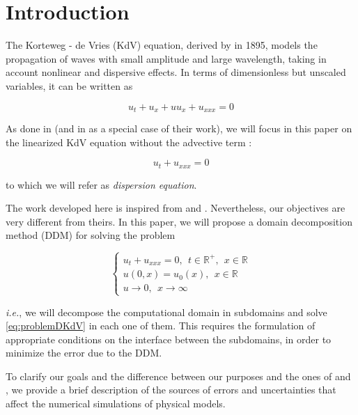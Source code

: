 \section{Introduction}

\indent The Korteweg - de Vries (KdV) equation, derived by \cite{kdv1895} in 1895, models the propagation of waves with small amplitude and large wavelength, taking in account nonlinear and dispersive effects. In terms of dimensionless but unscaled variables, it can be written as \cite{BBM1971}

\begin{equation}
	u_t + u_x + uu_x + u_{xxx} = 0
\end{equation}

\indent As done in \cite{zheng2008} (and in \cite{besse2015} as a special case of their work), we will focus in this paper on the linearized KdV equation without the advective term : 

\begin{equation}
 \label{eq:DKdV}
	u_t  + u_{xxx} = 0
\end{equation}

\noindent to which we will refer as \emph{dispersion equation}.

\indent The work developed here is inspired from \cite{zheng2008} and \cite{besse2015}. Nevertheless, our objectives are very different from theirs. In this paper, we will propose a domain decomposition method (DDM) for solving the problem

\begin{equation}
 \label{eq:problemDKdV}
\begin{cases}
	u_t + u_{xxx} = 0, \ \ t \in \mathbb{R}^+, \ \ x \in \mathbb{R} \\
	u(0,x) = u_0(x), \ \ x \in \mathbb{R} \\
	u \longrightarrow 0, \ \ x \longrightarrow \infty
\end{cases}
\end{equation}

\noindent \emph{i.e.}, we will decompose the computational domain in subdomains and solve \eqref{eq:problemDKdV} in each one of them. This requires the formulation of appropriate conditions on the interface between the subdomains, in order to minimize the error due to the DDM.

\indent To clarify our goals and the difference between our purposes and the ones of \cite{zheng2008} and \cite{besse2015}, we provide a brief description of the sources of errors and uncertainties that affect the numerical simulations of physical models.

